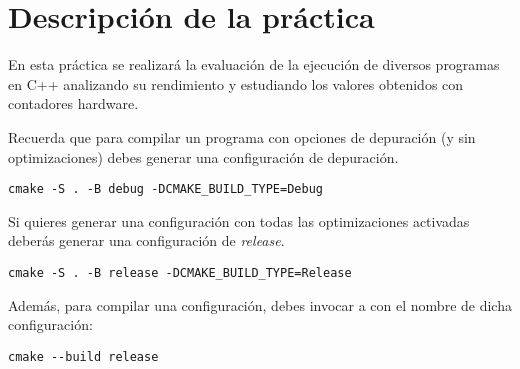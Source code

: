 \section{Descripción de la práctica}

En esta práctica se realizará la evaluación de la ejecución de diversos
programas en C++ analizando su rendimiento y estudiando los valores
obtenidos con contadores hardware.

Recuerda que para compilar un programa con opciones de depuración
(y sin optimizaciones) debes generar una configuración de depuración.

\begin{lstlisting}[style=terminal,aboveskip=1em,belowskip=1em]
cmake -S . -B debug -DCMAKE_BUILD_TYPE=Debug
\end{lstlisting}

Si quieres generar una configuración con todas las optimizaciones
activadas deberás generar una configuración de \emph{release}.

\begin{lstlisting}[style=terminal,aboveskip=1em,belowskip=1em]
cmake -S . -B release -DCMAKE_BUILD_TYPE=Release
\end{lstlisting}

Además, para compilar una configuración, debes invocar a 
con el nombre de dicha configuración:

\begin{lstlisting}[style=terminal,aboveskip=1em,belowskip=1em]
cmake --build release
\end{lstlisting}

